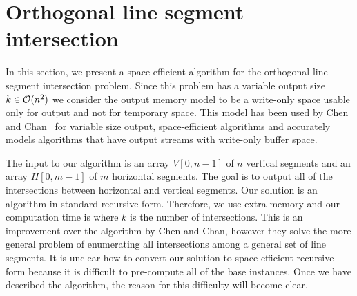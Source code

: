
\section{Orthogonal line segment intersection}\label{sec:orth}

In this section, we present a space-efficient algorithm for the
orthogonal line segment intersection problem.  Since this problem has
a variable output size $k \in \mathcal{O}(n^2)$ we consider the output memory
model to be a write-only space usable only for output and not for
temporary space.  This model has been used by Chen and
Chan~\cite{chen:space-efficient} for variable size output,
space-efficient algorithms and accurately models algorithms that have
output streams with write-only buffer space.

The input to our algorithm is an array $V[0,n-1]$ of $n$ vertical
segments and an array $H[0,m-1]$ of $m$ horizontal segments. The
goal is to output all of the intersections between horizontal and
vertical segments.  Our solution is an algorithm in standard recursive
form. Therefore, we use  extra memory and our computation
time is  where $k$ is the number of intersections.
This is an improvement over the algorithm by Chen and
Chan\cite{chen:space-efficient}, however they solve the more general
problem of enumerating all intersections among a general set of
line segments.  It is unclear how to convert our solution to
space-efficient recursive form because it is difficult to pre-compute
all of the base instances.  Once we have described the algorithm,
the reason for this difficulty will become clear.



